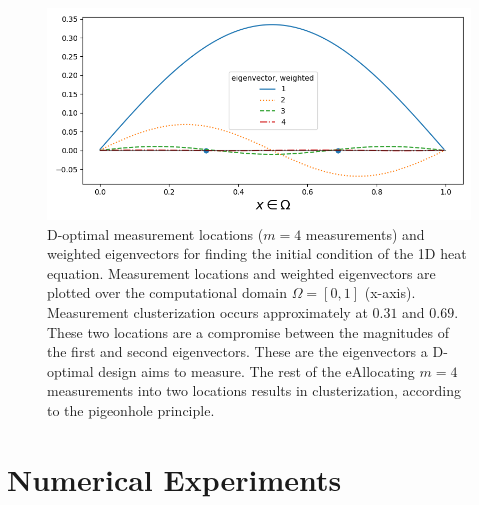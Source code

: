 \documentclass[ba]{imsart}
\theoremstyle{plain}
\theoremstyle{definition}
\theoremstyle{remark}
\begin{document}
\begin{figure}\label{fig:eigenvectors}
    \centering
    \includegraphics[width=\textwidth]{figs/eigenvectors_dst_scaled.png}
    \caption{D-optimal measurement locations ($m=4$ measurements) and
      weighted eigenvectors for finding the initial condition of the
      1D heat equation. Measurement locations and weighted
      eigenvectors are plotted over the computational domain $\Omega =
      [0, 1]$ (x-axis). Measurement clusterization occurs
      approximately at $0.31$ and $0.69$. These two locations are a
      compromise between the magnitudes of the first and second
      eigenvectors. These are the eigenvectors a D-optimal design aims
      to measure. The rest of the eAllocating $m=4$ measurements into two locations
      results in clusterization, according to the pigeonhole
      principle.}
  \label{fig:why}
\end{figure}
 \section{Numerical Experiments}
\end{document}
